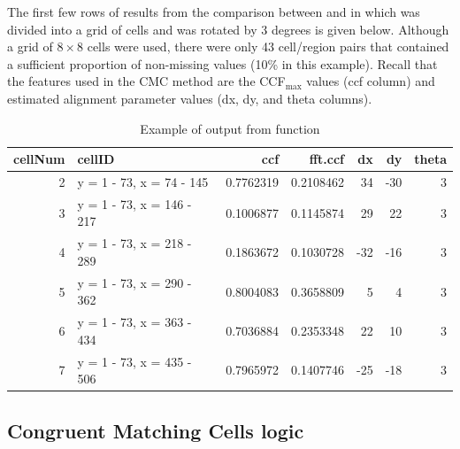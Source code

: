 The first few rows of results from the comparison between
 and  in which  was divided
into a grid of cells and  was rotated by 3 degrees is
given below. Although a grid of \(8 \times 8\) cells were used, there
were only 43 cell/region pairs that contained a sufficient proportion of
non-missing values (10\% in this example). Recall that the features used
in the CMC method are the CCF\(_{\max}\) values (ccf column) and
estimated alignment parameter values (dx, dy, and theta columns).

\begin{Schunk}
\end{Schunk}

\begin{Schunk}
\begin{table}[!h]

\caption{\label{tab:unnamed-chunk-10}\label{tab:cellCCF} Example of output from  function}
\centering
\begin{tabular}[t]{r|l|r|r|r|r|r}
\hline
cellNum & cellID & ccf & fft.ccf & dx & dy & theta\\
\hline
2 & y = 1 - 73, x = 74 - 145 & 0.7762319 & 0.2108462 & 34 & -30 & 3\\
\hline
3 & y = 1 - 73, x = 146 - 217 & 0.1006877 & 0.1145874 & 29 & 22 & 3\\
\hline
4 & y = 1 - 73, x = 218 - 289 & 0.1863672 & 0.1030728 & -32 & -16 & 3\\
\hline
5 & y = 1 - 73, x = 290 - 362 & 0.8004083 & 0.3658809 & 5 & 4 & 3\\
\hline
6 & y = 1 - 73, x = 363 - 434 & 0.7036884 & 0.2353348 & 22 & 10 & 3\\
\hline
7 & y = 1 - 73, x = 435 - 506 & 0.7965972 & 0.1407746 & -25 & -18 & 3\\
\hline
\end{tabular}
\end{table}

\end{Schunk}

\hypertarget{congruent-matching-cells-logic}{%
\subsection{Congruent Matching Cells
logic}\label{congruent-matching-cells-logic}}

